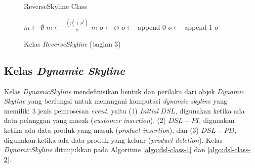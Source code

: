 \begin{figure}[H]
	\begin{algorithm}[H]
		\caption{ReverseSkyline Class}
		\begin{algorithmic}[1]
			\State $m \leftarrow \emptyset$
			 $m \leftarrow$ $\frac{(p_q^i + p^i)}{2}$
			\EndFor
			\State \Return $m$
			\EndProcedure
			\State $o \leftarrow \varnothing$
			 $o \leftarrow$ append $0$
			\Else {} $o \leftarrow$ append $1$
			\EndIf
			\EndFor
			\State \Return $o$
			\EndProcedure
		\end{algorithmic}
	\end{algorithm}
	\caption{Kelas \textit{ReverseSkyline} (bagian 3) \label{algo:rsl-class-3}}
\end{figure}

\subsection{Kelas \textit{Dynamic Skyline}}
\tab Kelas \textit{DynamicSkyline} mendefinisikan bentuk dan perilaku dari objek \textit{Dynamic Skyline} yang berfungsi untuk menangani komputasi \textit{dynamic skyline} yang memiliki 3 jenis pemrosesan \textit{event}, yaitu (1) \textit{Initial} $DSL$, digunakan ketika ada data pelanggan yang masuk (\textit{customer insertion}), (2) $DSL-PI$, digunakan ketika ada data produk yang masuk (\textit{product insertion}), dan (3) $DSL-PD$, digunakan ketika ada data produk yang keluar (\textit{product deletion}). Kelas \textit{DynamicSkyline} ditunjukkan pada Algoritme \ref{algo:dsl-class-1} dan \ref{algo:dsl-class-2}.


